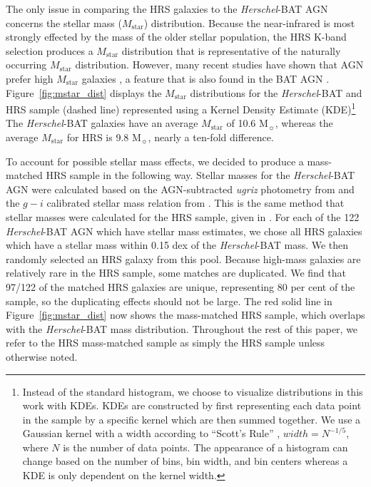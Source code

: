 \documentclass[fleqn, usenatbib]{mnras}
\newcommand{\herschel}{\emph{Herschel}}
\newcommand{\msun}{M$_{\sun}$}
\newcommand{\mstar}{$M_{\mathrm{star}}$}
\begin{document}
The only issue in comparing the HRS galaxies to the \herschel-BAT AGN concerns the stellar mass (\mstar) distribution. Because the near-infrared is most strongly effected by the mass of the older stellar population, the HRS K-band selection produces a \mstar{} distribution that is representative of the naturally occurring \mstar{} distribution. However, many recent studies have shown that AGN prefer high \mstar{} galaxies \citep[e.g.][]{Schawinski:2010zr,Xue:2010fj}, a feature that is also found in the BAT AGN \citep{Koss:2011vn}. Figure~\ref{fig:mstar_dist} displays the \mstar{} distributions for the \herschel-BAT and HRS sample (dashed line) represented using a Kernel Density Estimate (KDE)\footnote{\color{red}Instead of the standard histogram, we choose to visualize distributions in this work with KDEs. KDEs are constructed by first representing each data point in the sample by a specific kernel which are then summed together. We use a Gaussian kernel with a width according to ``Scott's Rule''  \citep{Scott:1992xy}, $width=N^{-1/5}$, where $N$ is the number of data points. The appearance of a histogram can change based on the number of bins, bin width, and bin centers whereas a KDE is only dependent on the kernel width.} The \herschel-BAT galaxies have an average \mstar{} of 10.6 \msun, whereas the average \mstar{} for HRS is 9.8 \msun, nearly a ten-fold difference. 

To account for possible stellar mass effects, we decided to produce a mass-matched HRS sample in the following way. Stellar masses for the \herschel-BAT AGN were calculated based on the AGN-subtracted \textit{ugriz} photometry from \citet{Koss:2011vn} and the $g-i$ calibrated stellar mass relation from \citet{Zibetti:2009jf}. This is the same method that stellar masses were calculated for the HRS sample, given in \citet{Cortese:2012fj}. For each of the 122 \herschel-BAT AGN which have stellar mass estimates, we chose all HRS galaxies which have a stellar mass within 0.15 dex of the \herschel-BAT mass. We then randomly selected an HRS galaxy from this pool. Because high-mass galaxies are relatively rare in the HRS sample, some matches are duplicated. We find that 97/122 of the matched HRS galaxies are unique, representing 80 per cent of the sample, so the duplicating effects should not be large. The red solid line in Figure~\ref{fig:mstar_dist} now shows the mass-matched HRS sample, which overlaps with the \herschel-BAT mass distribution. Throughout the rest of this paper, we refer to the HRS mass-matched sample as simply the HRS sample unless otherwise noted.
 
\end{document}
